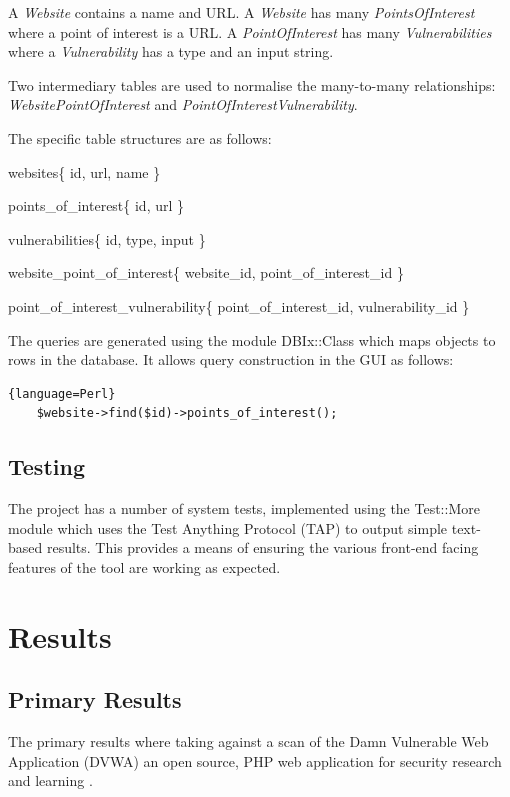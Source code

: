\documentclass[12pt,a4paper]{article}
\begin{document}
A \emph{Website} contains a name and URL.
A \emph{Website} has many \emph{PointsOfInterest} where a point of interest is a URL.
A \emph{PointOfInterest} has many \emph{Vulnerabilities} where a \emph{Vulnerability} has a type and an input string.

Two intermediary tables are used to normalise the many-to-many relationships: \emph{WebsitePointOfInterest} and \emph{PointOfInterestVulnerability}.

The specific table structures are as follows:

websites\{ id, url, name \}

points\_of\_interest\{ id, url \}

vulnerabilities\{ id, type, input \}

website\_point\_of\_interest\{ website\_id, point\_of\_interest\_id \}

point\_of\_interest\_vulnerability\{ point\_of\_interest\_id, vulnerability\_id \}

The queries are generated using the module DBIx::Class which maps objects to rows in the database.  It allows query construction in the GUI as follows:

\begin{lstlisting}{language=Perl}
    $website->find($id)->points_of_interest();
\end{lstlisting}

\subsection{Testing}
The project has a number of system tests, implemented using the Test::More module which uses the Test Anything Protocol (TAP) to output simple text-based results.  This provides a means of ensuring the various front-end facing features of the tool are working as expected.

\section{Results}

\subsection{Primary Results}
The primary results where taking against a scan of the Damn Vulnerable Web Application (DVWA) an open source, PHP web application for security research and learning \cite{DVWA:2010:Online}.
\end{document}
